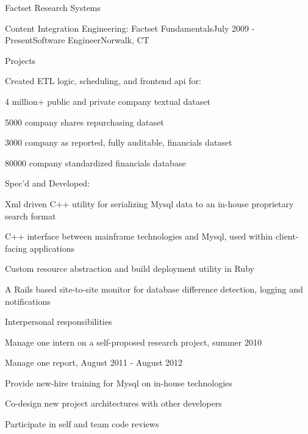 \documentclass{resume} %
\begin{document}
\begin{rSection}{Factset Research Systems}
\begin{rSubsection}{Content Integration Engineering: Factset Fundamentals}{July 2009 - Present}{Software Engineer}{Norwalk, CT}
\setlength{\itemindent}{1em}
\item Projects 
\setlength{\itemindent}{2em}
\item Created ETL logic, scheduling, and frontend api for:
\setlength{\itemindent}{3em}
\item 4 million+ public and private company textual dataset
\item 5000 company shares repurchasing dataset
\item 3000 company as reported, fully auditable, financials dataset
\item 80000 company standardized financials database
\setlength{\itemindent}{2em}
\item Spec'd and Developed:
\setlength{\itemindent}{3em}
\item Xml driven C++ utility for serializing Mysql data to an in-house proprietary search format
\item C++ interface between mainframe technologies and Mysql, used within client-facing applications
\item Custom resource abstraction and build deployment utility in Ruby
\item A Rails based site-to-site monitor for database difference detection, logging and notifications
\setlength{\itemindent}{1em}
\item Interpersonal responsibilities 
\setlength{\itemindent}{2em}
\item Manage one intern on a self-proposed research project, summer 2010
\item Manage one report, August 2011 - August 2012
\item Provide new-hire training for Mysql on in-house technologies
\item Co-design new project architectures with other developers
\item Participate in self and team code reviews 


\end{rSubsection}
\end{rSection}
\end{document}
